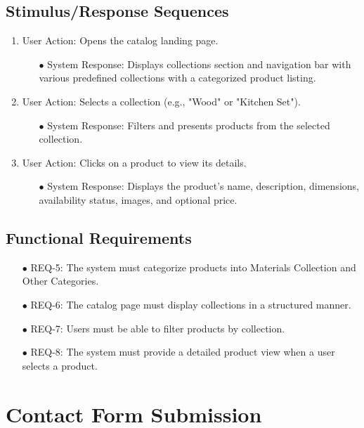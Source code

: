 \documentclass[oneside,a4paper,12pt,explicit]{book}
\begin{document}
\subsection{Stimulus/Response Sequences}
\begin{enumerate}
    \item User Action: Opens the catalog landing page.
    \begin{enumerate}
        \item[$\bullet$] System Response: Displays collections section and navigation bar with   various predefined collections with a categorized product listing.
    \end{enumerate}
    \item User Action: Selects a collection (e.g., "Wood" or "Kitchen Set").
    \begin{enumerate}
        \item[$\bullet$] System Response: Filters and presents products from the selected collection.
    \end{enumerate}
    \item User Action: Clicks on a product to view its details.
    \begin{enumerate}
        \item[$\bullet$] System Response: Displays the product’s name, description, dimensions, availability status, images, and optional price.
    \end{enumerate}
\end{enumerate}

\subsection{Functional Requirements}
\begin{enumerate}
    \item[$\bullet$] REQ-5: The system must categorize products into Materials Collection and Other Categories.
    \item[$\bullet$] REQ-6: The catalog page must display collections in a structured manner.
    \item[$\bullet$] REQ-7: Users must be able to filter products by collection.
    \item[$\bullet$] REQ-8: The system must provide a detailed product view when a user selects a product.
\end{enumerate}

\section{Contact Form Submission}
\end{document}
